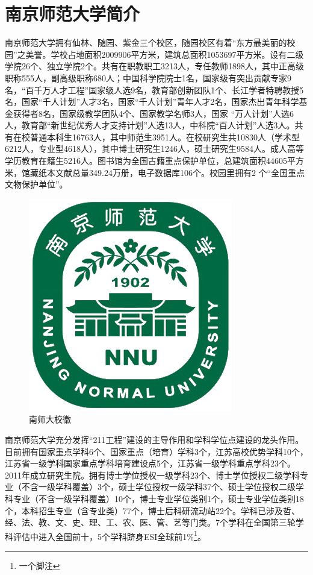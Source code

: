 \documentclass[UTF8,a4paper,twoside,zihao=-4]{ctexrep}
\theoremstyle{nonumberplain}
\begin{document}
\section{南京师范大学简介} 
南京师范大学拥有仙林、随园、紫金三个校区，随园校区有着“东方最美丽的校园”之美誉。学校占地面积2009906平方米，建筑总面积1053697平方米。设有二级学院26个、独立学院2个。共有在职教职工3213人，专任教师1898人，其中正高级职称555人，副高级职称680人；中国科学院院士1名，国家级有突出贡献专家9名，``百千万人才工程''国家级人选9名，教育部创新团队1个、长江学者特聘教授5名，国家``千人计划''人才3名，国家``千人计划''青年人才2名，国家杰出青年科学基金获得者8名，国家级教学团队4个、国家教学名师3人，国家 “万人计划”人选6人，教育部``新世纪优秀人才支持计划''人选13人，中科院``百人计划''人选3人。共有在校普通本科生16763人，其中师范生3951人。在校研究生共10830人（学术型6212人，专业型4618人），其中博士研究生1246人，硕士研究生9584人。成人高等学历教育在籍生5216人。图书馆为全国古籍重点保护单位，总建筑面积44605平方米，馆藏纸本文献总量349.24万册，电子数据库106个。校园里拥有2 个“全国重点文物保护单位”。
\begin{figure}[htb]
    \centering
    \includegraphics[scale=.4]{cover/Nanjing_Normal_University_logo.png}
    \caption{南师大校徽}\label{fig:logo}
\end{figure}

南京师范大学充分发挥``211工程''建设的主导作用和学科学位点建设的龙头作用。目前拥有国家重点学科6个、国家重点（培育）学科3个，江苏高校优势学科10个，江苏省一级学科国家重点学科培育建设点5个，江苏省一级学科重点学科23个。2011年成立研究生院。拥有博士学位授权一级学科23个、博士学位授权二级学科专业（不含一级学科覆盖）3个，硕士学位授权一级学科37个、硕士学位授权二级学科专业（不含一级学科覆盖）10个，博士专业学位类别1个，硕士专业学位类别18个，本科招生专业（含专业类）77个，博士后科研流动站22个。学科已涉及哲、经、法、教、文、史、理、工、农、医、管、艺等门类。7个学科在全国第三轮学科评估中进入全国前十，5个学科跻身ESI全球前1\%\footnote{一个脚注}。
\end{document}
